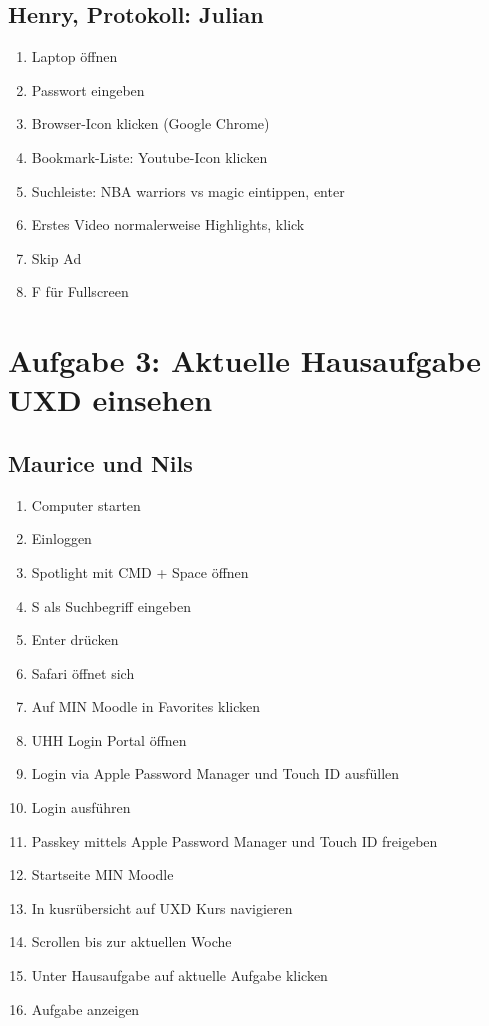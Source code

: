 \documentclass[a4paper,10pt]{article}
\begin{document}
    \subsection{Henry, Protokoll: Julian}
    \begin{enumerate}
        \item Laptop öffnen
        \item Passwort eingeben
        \item Browser-Icon klicken (Google Chrome)
        \item Bookmark-Liste: Youtube-Icon klicken
        \item Suchleiste: NBA warriors vs magic eintippen, enter
        \item Erstes Video normalerweise Highlights, klick
        \item Skip Ad
        \item F für Fullscreen
    \end{enumerate}

    \section{Aufgabe 3: Aktuelle Hausaufgabe UXD einsehen}
    \subsection{Maurice und Nils}
    \begin{enumerate}
        \item Computer starten
        \item Einloggen
        \item Spotlight mit CMD + Space öffnen
        \item \glqq S\grqq{} als Suchbegriff eingeben
        \item Enter drücken
        \item Safari öffnet sich
        \item Auf MIN Moodle in Favorites klicken
        \item UHH Login Portal öffnen
        \item Login via Apple Password Manager und Touch ID ausfüllen
        \item Login ausführen
        \item Passkey mittels Apple Password Manager und Touch ID freigeben
        \item Startseite MIN Moodle
        \item In kusrübersicht auf UXD Kurs navigieren
        \item Scrollen bis zur aktuellen Woche
        \item Unter \glqq Hausaufgabe\grqq{} auf aktuelle Aufgabe klicken
        \item Aufgabe anzeigen
    \end{enumerate}
\end{document}

